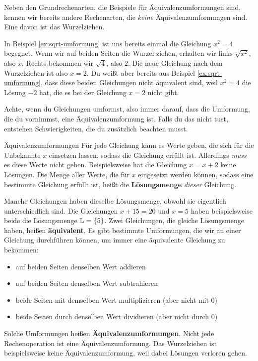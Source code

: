 \documentclass[../../main.tex]{subfiles}
\begin{document}
Neben den Grundrechenarten, die Beispiele für Äquivalenzumformungen sind, kennen wir bereits andere Rechenarten, die \emph{keine} Äquivalenzumformungen sind. Eine davon ist das Wurzelziehen.

\begin{example}{}
    In Beispiel \ref{ex:sqrt-umformung} ist uns bereits einmal die Gleichung $x^2=4$ begegnet. Wenn wir auf beiden Seiten die Wurzel ziehen, erhalten wir links $\sqrt{x^2}$, also $x$. Rechts bekommen wir $\sqrt{4}$, also $2$. Die neue Gleichung nach dem Wurzelziehen ist also $x=2$. Du weißt aber bereits aus Beispiel \ref{ex:sqrt-umformung}, dass diese beiden Gleichungen nicht äquivalent sind, weil $x^2=4$ die Lösung $-2$ hat, die es bei der Gleichung $x=2$ nicht gibt.
\end{example}

Achte, wenn du Gleichungen umformst, also immer darauf, dass die Umformung, die du vornimmst, eine Äquivalenzumformung ist. Falls du das nicht tust, entstehen Schwierigkeiten, die du zusätzlich beachten musst.

\begin{nutshell}{Äquivalenzumformungen}
    Für jede Gleichung kann es Werte geben, die sich für die Unbekannte $x$ einsetzen lassen, sodass die Gleichung erfüllt ist. Allerdings \emph{muss} es diese Werte nicht geben. Beispielsweise hat die Gleichung $x=x+2$ keine Lösungen. Die Menge aller Werte, die für $x$ eingesetzt werden können, sodass eine bestimmte Gleichung erfüllt ist, heißt die \textbf{Lösungsmenge} \Solutions \emph{dieser} Gleichung.
    
    Manche Gleichungen haben dieselbe Lösungsmenge, obwohl sie eigentlich unterschiedlich sind. Die Gleichungen $x+15=20$ und $x=5$ haben beispielsweise beide die Lösungsmenge $\mathbb{L}=\{5\}$. Zwei Gleichungen, die gleiche Lösungsmenge haben, heißen \textbf{äquivalent}. Es gibt bestimmte Umformungen, die wir an einer Gleichung durchführen können, um immer eine äquivalente Gleichung zu bekommen:
    \begin{itemize}
        \item auf beiden Seiten denselben Wert addieren
        \item auf beiden Seiten denselben Wert subtrahieren
        \item beide Seiten mit demselben Wert multiplizieren (aber nicht mit 0)
        \item beide Seiten durch denselben Wert dividieren (aber nicht durch 0)
    \end{itemize}
    Solche Umformungen heißen \textbf{Äquivalenzumformungen}. Nicht jede Rechenoperation ist eine Äquivalenzumformung. Das Wurzelziehen ist beispielsweise keine Äquivalenzumformung, weil dabei Lösungen verloren gehen.
\end{nutshell}
\end{document}
